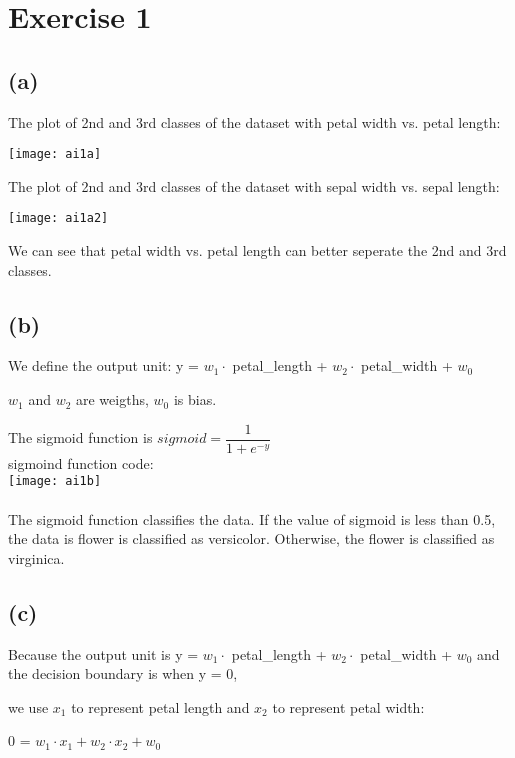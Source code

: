 \documentclass[11pt]{article}
\begin{document}
\section*{Exercise 1}

\subsection*{(a)}

The plot of 2nd and 3rd classes of the dataset with petal width vs. petal length:

\texttt{[image: ai1a]}

The plot of 2nd and 3rd classes of the dataset with sepal width vs. sepal length:

\texttt{[image: ai1a2]}

We can see that petal width vs. petal length can better seperate the 2nd and 3rd classes.

\subsection*{(b)}

We define the output unit: y = $w_1 \cdot$ petal\_length + $w_2 \cdot$ petal\_width + $w_0$

$w_1$ and $w_2$ are weigths, $w_0$ is bias.

The sigmoid function is $sigmoid = \dfrac{1}{1 + e^{-y}}$\\

sigmoind function code:\\

\texttt{[image: ai1b]}
\\\\
The sigmoid function classifies the data. If the value of sigmoid is less than 0.5, the data is flower is classified as versicolor.
Otherwise, the flower is classified as virginica. 

\subsection*{(c)}

Because the output unit is y = $w_1 \cdot$ petal\_length + $w_2 \cdot$ petal\_width + $w_0$ and the decision boundary is when y = 0, 

we use $x_1$ to represent petal length and $x_2$ to represent petal width: 

0 = $w_1 \cdot x_1 + w_2 \cdot x_2 + w_0$ \\
\end{document}
